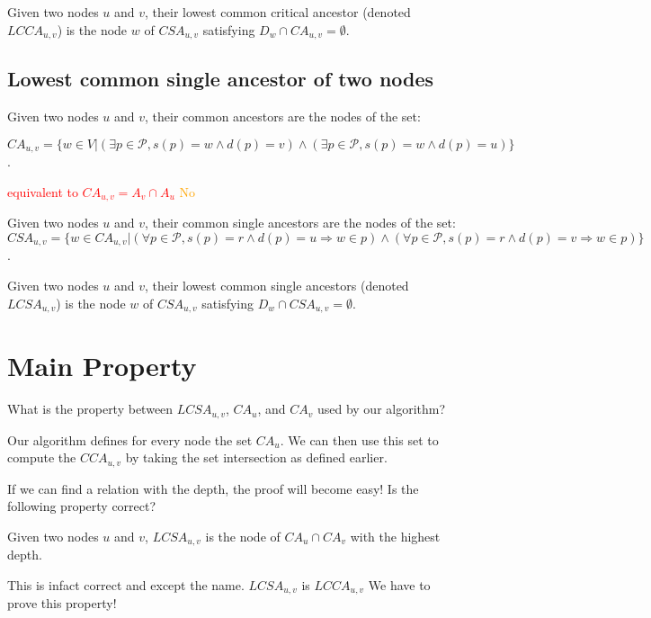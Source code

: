 \documentclass{paper}
\begin{document}
Given two nodes $u$ and $v$, their lowest common critical ancestor (denoted $LCCA_{u,v}$) is the node $w$ of $CSA_{u,v}$ satisfying $D_w\cap CA_{u,v}=\emptyset$.


\subsection{Lowest common single ancestor of two nodes}


Given two nodes $u$ and $v$, their common ancestors are the nodes of the set:

\[
CA_{u,v}=\{w\in V|(\exists p\in\mathcal{P},s(p)=w\wedge d(p)=v)\wedge(\exists p\in\mathcal{P},s(p)=w\wedge d(p)=u)\}
\].

\textcolor{red}{equivalent to $CA_{u,v}=A_v\cap A_u$} \textcolor{orange}{No}

Given two nodes $u$ and $v$, their common single ancestors are the nodes of the set: $CSA_{u,v}=\{w\in CA_{u,v}|(\forall p\in\mathcal{P},s(p)=r\wedge d(p)=u\Rightarrow w\in p)\wedge(\forall p\in\mathcal{P},s(p)=r\wedge d(p)=v\Rightarrow w\in p) \}$.

Given two nodes $u$ and $v$, their lowest common single ancestors (denoted $LCSA_{u,v}$) is the node $w$ of $CSA_{u,v}$ satisfying $D_w\cap CSA_{u,v}=\emptyset$.

\section{Main Property}
{\color{red}
What is the property between $LCSA_{u,v}$, $CA_u$, and $CA_v$ used by our algorithm?

\color{orange}
Our algorithm defines for every node the set $CA_u$. We can then use this set to compute the $CCA_{u,v}$ by taking the set intersection as defined earlier.


\color{red}

If we can find a relation with the depth, the proof will become easy! Is the following property correct?

Given two nodes $u$ and $v$, $LCSA_{u,v}$ is the node of $CA_u\cap CA_v$ with the highest depth.

\color{orange}
This is infact correct and except the name. $LCSA_{u,v}$ is $LCCA_{u,v}$
\color{red}
We have to prove this property!

}
\end{document}
